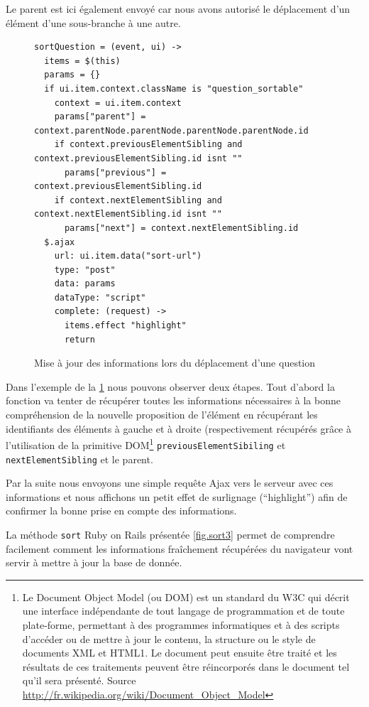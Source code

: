 \documentclass[12pt,a4paper]{book}
\begin{document}
Le parent est ici également envoyé car nous avons autorisé le déplacement d'un élément d'une sous-branche à une autre.

\begin{figure}[h]
\begin{lstlisting}
sortQuestion = (event, ui) ->
  items = $(this)
  params = {}
  if ui.item.context.className is "question_sortable"
    context = ui.item.context
    params["parent"] = context.parentNode.parentNode.parentNode.parentNode.id
    if context.previousElementSibling and context.previousElementSibling.id isnt ""
      params["previous"] = context.previousElementSibling.id
    if context.nextElementSibling and context.nextElementSibling.id isnt ""
      params["next"] = context.nextElementSibling.id 
  $.ajax
    url: ui.item.data("sort-url")
    type: "post"
    data: params
    dataType: "script"
    complete: (request) ->
      items.effect "highlight"
      return
\end{lstlisting}
 \caption{Mise à jour des informations lors du déplacement d'une question}
 \label{fig.sort2}
\end{figure}

Dans l'exemple de la \cref{fig.sort2} nous pouvons observer deux étapes. Tout d'abord la fonction va tenter de récupérer toutes les informations nécessaires à la bonne compréhension de la nouvelle proposition de l'élément en récupérant les identifiants des éléments à gauche et à droite (respectivement récupérés grâce à l'utilisation de la primitive DOM\footnote{Le Document Object Model (ou DOM) est un standard du W3C qui décrit une interface indépendante de tout langage de programmation et de toute plate-forme, permettant à des programmes informatiques et à des scripts d'accéder ou de mettre à jour le contenu, la structure ou le style de documents XML et HTML1. Le document peut ensuite être traité et les résultats de ces traitements peuvent être réincorporés dans le document tel qu'il sera présenté. Source \url{http://fr.wikipedia.org/wiki/Document_Object_Model}} \texttt{previousElementSibiling} et \texttt{nextElementSibling} et le parent.

Par la suite nous envoyons une simple requête Ajax vers le serveur avec ces informations et nous affichons un petit effet de surlignage (``highlight'') afin de confirmer la bonne prise en compte des informations.

La méthode \texttt{sort} Ruby on Rails présentée \cref{fig.sort3} permet de comprendre facilement comment les informations fraîchement récupérées du navigateur vont servir à mettre à jour la base de donnée. 
\end{document}
